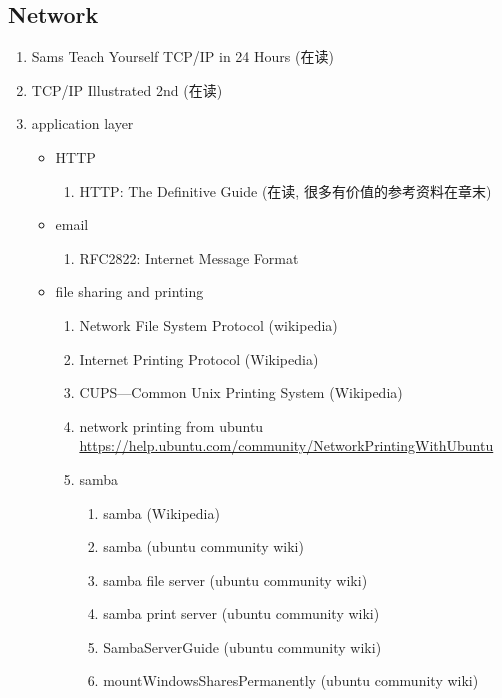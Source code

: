 \documentclass{article}
\begin{document}
\subsection{Network}
\begin{enumerate}
    \item Sams Teach Yourself TCP/IP in 24 Hours (在读)
    \item TCP/IP Illustrated 2nd (在读)
    \item application layer
        \begin{itemize}
            \item HTTP
                \begin{enumerate}
                    \item HTTP: The Definitive Guide (在读, 很多有价值的参考资料在章末)
                \end{enumerate}
            \item email
                \begin{enumerate}
                    \item RFC2822: Internet Message Format
                \end{enumerate}
            \item file sharing and printing
                \begin{enumerate}
                    \item Network File System Protocol (wikipedia)
                    \item Internet Printing Protocol (Wikipedia)
                    \item CUPS---Common Unix Printing System (Wikipedia)
                    \item network printing from ubuntu \url{https://help.ubuntu.com/community/NetworkPrintingWithUbuntu}
                    \item samba
                        \begin{enumerate}
                            \item samba (Wikipedia)
                            \item samba (ubuntu community wiki)
                            \item samba file server (ubuntu community wiki)
                            \item samba print server (ubuntu community wiki)
                            \item SambaServerGuide (ubuntu community wiki)
                            \item mountWindowsSharesPermanently (ubuntu community wiki)

\end{enumerate}
\end{enumerate}
\end{itemize}
\end{enumerate}
\end{document}
